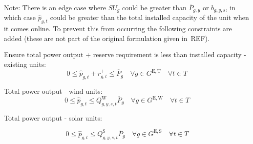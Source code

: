 \documentclass{article}
\newcommand{\sGeneratorsExistingThermal}{G^{\mathrm{E,T}}}
\newcommand{\sGeneratorsExistingWind}{G^{\mathrm{E,W}}}
\newcommand{\sGeneratorsExistingSolar}{G^{\mathrm{E,S}}}
\newcommand{\sGeneratorsCandidateThermal}{G^{\mathrm{C,T}}}
\newcommand{\sGeneratorsCandidateWind}{G^{\mathrm{C,W}}}
\newcommand{\sGeneratorsCandidateSolar}{G^{\mathrm{C,S}}}
\newcommand{\sIntervals}{T}
\newcommand{\iGenerator}{g}
\newcommand{\iYear}{y}
\newcommand{\iScenario}{s}
\newcommand{\iInterval}{t}
\newcommand{\cPowerOutputMax}[1][\iGenerator,\iYear]{\overline{P}_{#1}}
\newcommand{\cCapacityFactorWind}[1][\iGenerator,\iYear,\iScenario,\iInterval]{Q_{#1}^{\mathrm{W}}}
\newcommand{\cCapacityFactorSolar}[1][\iGenerator,\iYear,\iScenario,\iInterval]{Q_{#1}^{\mathrm{S}}}
\newcommand{\cRampRateStartup}[1][\iGenerator]{SU_{#1}}
\newcommand{\vReserveUp}[1][\iGenerator,\iInterval]{r^{+}_{#1}}
\newcommand{\vPowerTotal}[1][\iGenerator,\iInterval]{\hat{p}_{#1}}
\newcommand{\vInstalledCapacityTotalScenario}[1][\iGenerator,\iYear,\iScenario]{b_{#1}}
\begin{document}
Note: There is an edge case where $\cRampRateStartup$ could be greater than $\cPowerOutputMax$ or $\vInstalledCapacityTotalScenario$, in which case $\vPowerTotal$ could be greater than the total installed capacity of the unit when it comes online. To prevent this from occurring the following constraints are added (these are not part of the original formulation given in~REF).

Ensure total power output + reserve requirement is less than installed capacity - existing units:
\begin{equation}
	0 \leq \vPowerTotal + \vReserveUp \leq \cPowerOutputMax[\iGenerator] \quad \forall \iGenerator \in \sGeneratorsExistingThermal  \quad \forall \iInterval \in \sIntervals
\end{equation}


Total power output - wind units:
\begin{equation}
0 \leq \vPowerTotal \leq \cCapacityFactorWind \cPowerOutputMax[\iGenerator] \quad \forall \iGenerator \in \sGeneratorsExistingWind  \quad \forall \iInterval \in \sIntervals 
\end{equation}


Total power output - solar units:

\begin{equation}
0 \leq \vPowerTotal \leq \cCapacityFactorSolar \cPowerOutputMax[\iGenerator] \quad \forall \iGenerator \in \sGeneratorsExistingSolar  \quad \forall \iInterval \in \sIntervals 
\end{equation}

\end{document}
